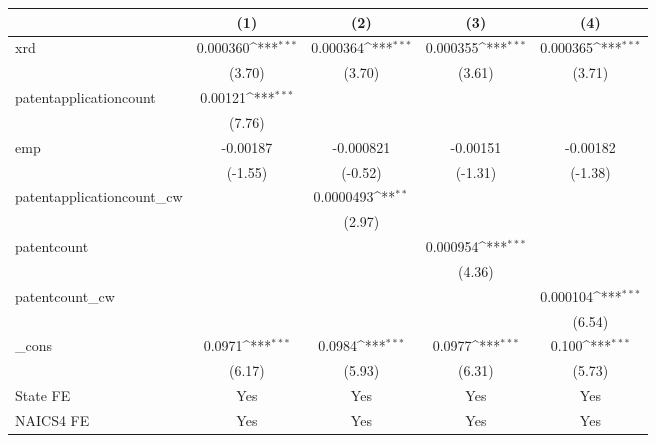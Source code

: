 {
\def\sym#1{\ifmmode^{#1}\else\(^{#1}\)\fi}
\begin{tabular}{l*{4}{c}}
\hline\hline
            &\multicolumn{1}{c}{(1)}         &\multicolumn{1}{c}{(2)}         &\multicolumn{1}{c}{(3)}         &\multicolumn{1}{c}{(4)}         \\
\hline
xrd         &    0.000360\sym{***}&    0.000364\sym{***}&    0.000355\sym{***}&    0.000365\sym{***}\\
            &      (3.70)         &      (3.70)         &      (3.61)         &      (3.71)         \\
[1em]
patentapplicationcount&     0.00121\sym{***}&                     &                     &                     \\
            &      (7.76)         &                     &                     &                     \\
[1em]
emp         &    -0.00187         &   -0.000821         &    -0.00151         &    -0.00182         \\
            &     (-1.55)         &     (-0.52)         &     (-1.31)         &     (-1.38)         \\
[1em]
patentapplicationcount\_cw&                     &   0.0000493\sym{**} &                     &                     \\
            &                     &      (2.97)         &                     &                     \\
[1em]
patentcount &                     &                     &    0.000954\sym{***}&                     \\
            &                     &                     &      (4.36)         &                     \\
[1em]
patentcount\_cw&                     &                     &                     &    0.000104\sym{***}\\
            &                     &                     &                     &      (6.54)         \\
[1em]
\_cons      &      0.0971\sym{***}&      0.0984\sym{***}&      0.0977\sym{***}&       0.100\sym{***}\\
            &      (6.17)         &      (5.93)         &      (6.31)         &      (5.73)         \\
[1em]
State FE    &         Yes         &         Yes         &         Yes         &         Yes         \\
[1em]
NAICS4 FE   &         Yes         &         Yes         &         Yes         &         Yes         \\

\end{tabular}}
